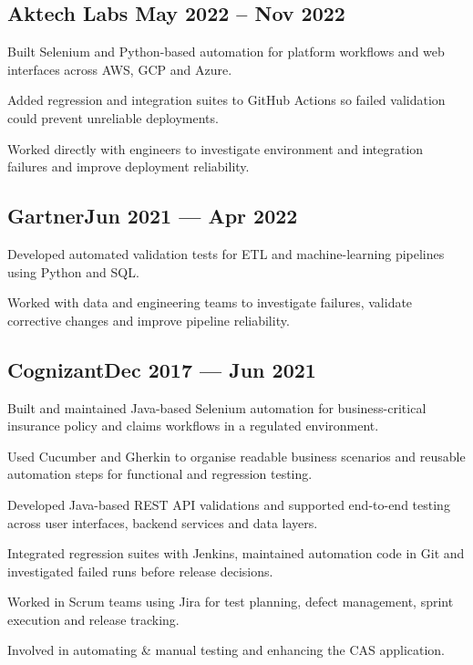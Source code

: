 \subsection{Aktech Labs \hfill May 2022 -- Nov 2022}
\begin{zitemize}
\item Built Selenium and Python-based automation for platform workflows and web interfaces across AWS, GCP and Azure.
\item Added regression and integration suites to GitHub Actions so failed validation could prevent unreliable deployments.
\item Worked directly with engineers to investigate environment and integration failures and improve deployment reliability.
\end{zitemize}

\subsection{{Gartner\hfill Jun 2021 --- Apr 2022}}
\begin{zitemize}
  \item Developed automated validation tests for ETL and machine-learning pipelines using Python and SQL.
  \item Worked with data and engineering teams to investigate failures, validate corrective changes and improve pipeline reliability.
\end{zitemize}

\subsection{{Cognizant\hfill Dec 2017 --- Jun 2021}}
\begin{zitemize}
\item Built and maintained Java-based Selenium automation for business-critical insurance policy and claims workflows in a regulated environment.
\item Used Cucumber and Gherkin to organise readable business scenarios and reusable automation steps for functional and regression testing.
\item Developed Java-based REST API validations and supported end-to-end testing across user interfaces, backend services and data layers.
\item Integrated regression suites with Jenkins, maintained automation code in Git and investigated failed runs before release decisions.
\item Worked in Scrum teams using Jira for test planning, defect management, sprint execution and release tracking.
\end{zitemize}
\begin{zitemize}
\item Involved in automating \& manual testing and enhancing the CAS application.
\end{zitemize}

